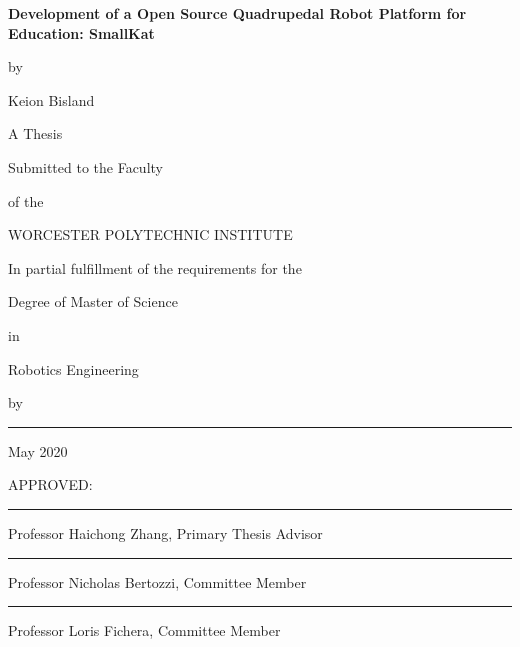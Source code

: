 \documentclass[12pt]{report}
\begin{document}
\newcommand{\brk}{\vspace*{0.18in}}

\thispagestyle{empty}

\begin{center}

\brk
   {\large 
	\textbf{
	Development of a Open Source Quadrupedal Robot Platform for Education: SmallKat
	}
   }


\brk
by

\brk
Keion Bisland

\brk\brk
A Thesis

\brk
Submitted to the Faculty

\brk
of the 

\brk
WORCESTER POLYTECHNIC INSTITUTE

\brk
In partial fulfillment of the requirements for the

\brk
Degree of Master of Science

\brk
in

\brk
Robotics Engineering

\brk
by

\brk\brk
\rule{3in}{1.2pt}
\brk

May 2020
\end{center}

	
\vfill
APPROVED:

\vspace{0.35in}
\rule{3in}{0.8pt}

Professor Haichong Zhang, Primary Thesis Advisor


\vspace{0.35in}
\rule{3in}{0.8pt}

Professor Nicholas Bertozzi, Committee Member


\vspace{0.35in}
\rule{3in}{0.8pt}

Professor Loris Fichera, Committee Member
\end{document}
